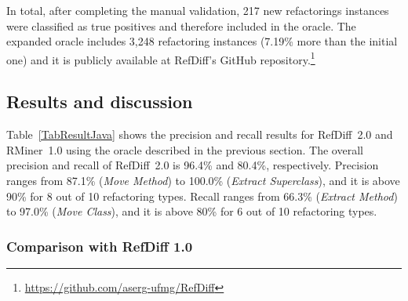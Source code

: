 In total, after completing the manual validation, 217 new refactorings instances were classified as true positives and therefore included in the oracle.
The expanded oracle includes 3,248 refactoring instances (7.19\% more than the initial one) and it is publicly available at RefDiff's GitHub repository.\footnote{\url{https://github.com/aserg-ufmg/RefDiff}}

\subsection{Results and discussion}
\label{sec:eval:java:results}



Table~\ref{TabResultJava} shows the precision and recall results for RefDiff~2.0 and RMiner~1.0 using the oracle described in the previous section. The overall precision and recall of RefDiff~2.0 is 96.4\% and 80.4\%, respectively.
Precision ranges from 87.1\% (\emph{Move Method}) to 100.0\% (\emph{Extract Superclass}), and it is above 90\% for 8 out of 10 refactoring types.
Recall ranges from 66.3\% (\emph{Extract Method}) to 97.0\% (\emph{Move Class}), and it is above 80\% for 6 out of 10 refactoring types.

\subsubsection{Comparison with RefDiff 1.0}

